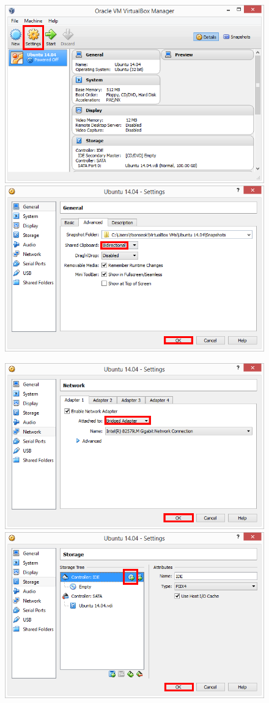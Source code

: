 \newpage

\begin{figure}[h]
\centering
\includegraphics[width=0.49\columnwidth]{pictures/chapter3/vm11.png}
\includegraphics[width=0.49\columnwidth]{pictures/chapter3/vm12.png}
\end{figure}

\begin{figure}[h]
\centering
\includegraphics[width=0.49\columnwidth]{pictures/chapter3/vm13.png}
\includegraphics[width=0.49\columnwidth]{pictures/chapter3/vm14.png}
\end{figure}

